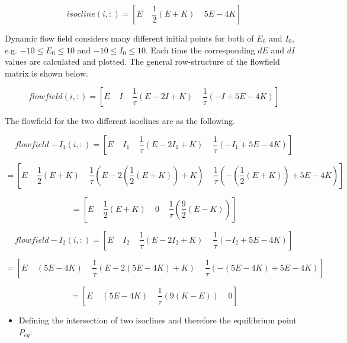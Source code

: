 \documentclass{article}
\begin{document}
\begin{equation*}
  isocline(i,:)=[E \;\;\;\; \frac{1}{2}(E+K) \;\;\;\; 5E-4K]
\end{equation*}

Dynamic flow field considers many different initial points for both of $E_0$ and $I_0$, e.g. $-10\leq E_0 \leq 10$ and $-10\leq I_0 \leq 10$. Each time the corresponding $dE$ and $dI$ values are calculated and plotted. The general row-structure of the flowfield matrix is shown below.

\begin{equation*}
  flowfield(i,:)=[E \;\;\;\; I \;\;\;\; \dfrac{1}{\tau}(E-2 I+K)\;\;\;\; \frac{1}{\tau}(-I+5 E-4K)]
\end{equation*}
  
The flowfield for the two different isoclines are as the following.

\begin{equation*}
  flowfield-I_1(i,:)=[E \;\;\;\; I_1 \;\;\;\;   \dfrac{1}{\tau}(E-2I_1+K)\;\;\;\; \frac{1}{\tau}(-I_1+5E-4K)]
\end{equation*}

\begin{equation*}
  =[E \;\;\;\; \frac{1}{2}(E+K) \;\;\;\;   \dfrac{1}{\tau}(E-2(\frac{1}{2}(E+K))+K)\;\;\;\; \frac{1}{\tau}(-(\frac{1}{2}(E+K))+5E-4K)]
\end{equation*}

\begin{equation*}
  =[E \;\;\;\; \frac{1}{2}(E+K) \;\;\;\;0\;\;\;\; \frac{1}{\tau}(\frac{9}{2}(E-K))]
\end{equation*}

\begin{equation*}
  flowfield-I_2(i,:)=[E \;\;\;\; I_2 \;\;\;\;   \dfrac{1}{\tau}(E-2I_2+K)\;\;\;\; \frac{1}{\tau}(-I_2+5E-4K)]
\end{equation*}

\begin{equation*}
  =[E \;\;\;\; (5E-4K) \;\;\;\;   \dfrac{1}{\tau}(E-2(5E-4K)+K)\;\;\;\; \frac{1}{\tau}(-(5E-4K)+5E-4K)]
\end{equation*}

\begin{equation*}
  =[E \;\;\;\; (5E-4K) \;\;\;\;   \dfrac{1}{\tau}(9(K-E))\;\;\;\; 0]
\end{equation*}

\begin{itemize}
 \item Defining the intersection of two isoclines and therefore the equilibrium point $P_{eq}$:
\end{itemize}
\end{document}
